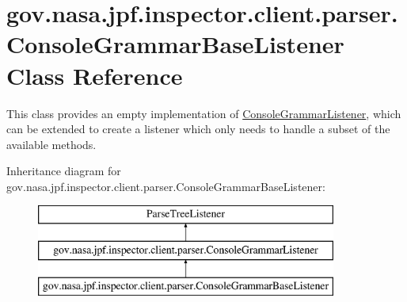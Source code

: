 \hypertarget{classgov_1_1nasa_1_1jpf_1_1inspector_1_1client_1_1parser_1_1_console_grammar_base_listener}{}\section{gov.\+nasa.\+jpf.\+inspector.\+client.\+parser.\+Console\+Grammar\+Base\+Listener Class Reference}
\label{classgov_1_1nasa_1_1jpf_1_1inspector_1_1client_1_1parser_1_1_console_grammar_base_listener}


This class provides an empty implementation of \hyperlink{interfacegov_1_1nasa_1_1jpf_1_1inspector_1_1client_1_1parser_1_1_console_grammar_listener}{Console\+Grammar\+Listener}, which can be extended to create a listener which only needs to handle a subset of the available methods.  


Inheritance diagram for gov.\+nasa.\+jpf.\+inspector.\+client.\+parser.\+Console\+Grammar\+Base\+Listener\+:\begin{figure}[H]
\begin{center}
\leavevmode
\includegraphics[height=3.000000cm]{classgov_1_1nasa_1_1jpf_1_1inspector_1_1client_1_1parser_1_1_console_grammar_base_listener}
\end{center}
\end{figure}
